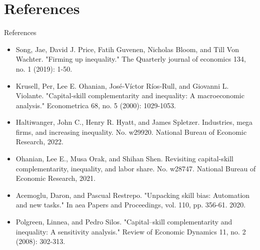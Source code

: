 \documentclass[notes,11pt, aspectratio=169]{beamer}
\newenvironment{wideitemize}{\itemize\addtolength{\itemsep}{10pt}}{\enditemize}
\begin{document}
\section*{References}
\begin{frame}{References}
  \begin{itemize}
    \item Song, Jae, David J. Price, Fatih Guvenen, Nicholas Bloom, and Till Von Wachter. "Firming up inequality." The Quarterly journal of economics 134, no. 1 (2019): 1-50.
    \item Krusell, Per, Lee E. Ohanian, José‐Víctor Ríos‐Rull, and Giovanni L. Violante. "Capital‐skill complementarity and inequality: A macroeconomic analysis." Econometrica 68, no. 5 (2000): 1029-1053.
    \item Haltiwanger, John C., Henry R. Hyatt, and James Spletzer. Industries, mega firms, and increasing inequality. No. w29920. National Bureau of Economic Research, 2022.
    \item  Ohanian, Lee E., Musa Orak, and Shihan Shen. Revisiting capital-skill complementarity, inequality, and labor share. No. w28747. National Bureau of Economic Research, 2021.
    \item Acemoglu, Daron, and Pascual Restrepo. "Unpacking skill bias: Automation and new tasks." In aea Papers and Proceedings, vol. 110, pp. 356-61. 2020.
    \item Polgreen, Linnea, and Pedro Silos. "Capital–skill complementarity and inequality: A sensitivity analysis." Review of Economic Dynamics 11, no. 2 (2008): 302-313.
  \end{itemize}
\end{frame}


\end{document}
